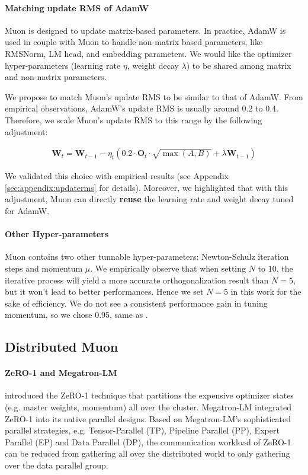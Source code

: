 \paragraph{Matching update RMS of AdamW}

Muon is designed to update matrix-based parameters. In practice, AdamW is used in couple with Muon to handle non-matrix based parameters, like RMSNorm, LM head, and embedding parameters. 
We would like the optimizer hyper-parameters (learning rate $\eta$, weight decay $\lambda$) to be shared among
matrix and non-matrix parameters. 

We propose to match Muon's update RMS to be similar to that of AdamW. From empirical observations, AdamW's update RMS is usually around 0.2 to 0.4. Therefore, we scale Muon's update RMS to this range by the following adjustment:

\begin{align}
\mathbf{W}_t = \mathbf{W}_{t-1} - \eta_t (0.2\cdot\mathbf{O}_t\cdot\sqrt{\max(A,B)} + \lambda \mathbf{W}_{t-1})
\end{align}

 We validated this choice with empirical results (see Appendix \ref{sec:appendix:updaterms} for details). 
Moreover, we highlighted that with this adjustment, Muon can directly \textbf{reuse} the learning rate and weight decay tuned for AdamW. 

\paragraph{Other Hyper-parameters} Muon contains two other tunnable hyper-parameters: Newton-Schulz iteration steps and momentum $\mu$. We empirically observe that when setting $N$ to $10$, the iterative process will yield a more accurate orthogonalization result than $N=5$, but it won't lead to better performances. Hence we set $N = 5$ in this work for the sake of efficiency. We do not see a consistent performance gain in tuning momentum, so we chose 0.95, same as \cite{jordan2024muon}.

\subsection{Distributed Muon}
\label{sec:analysis:distrib}

\paragraph{ZeRO-1 and Megatron-LM}
\cite{Rajbhandari_2020} introduced the ZeRO-1 technique that partitions the expensive optimizer states (e.g. master weights, momentum) all over the cluster. Megatron-LM \citep{shoeybi2020megatronlmtrainingmultibillionparameter} integrated ZeRO-1 into its native parallel designs. Based on Megatron-LM's sophisticated parallel strategies, e.g. Tensor-Parallel (TP), Pipeline Parallel (PP), Expert Parallel (EP) and Data Parallel (DP), the communication workload of ZeRO-1 can be reduced from gathering all over the distributed world to only gathering over the data parallel group.

